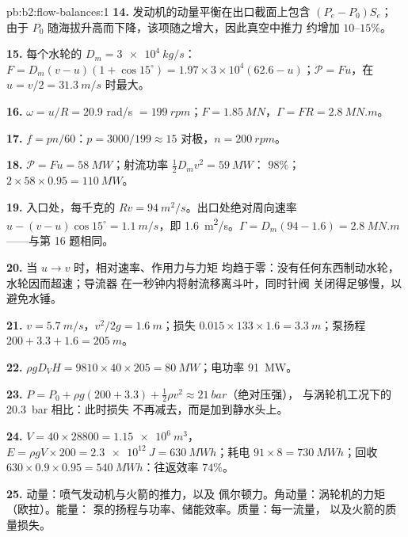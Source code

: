 \begin{solution}{pb:b2:flow-balances:1}
\textbf{14.} 发动机的动量平衡在出口截面上包含 $(P_e - P_0)S_e$；
由于 $P_0$ 随海拔升高而下降，该项随之增大，因此真空中推力
约增加 $10$--$15\%$。

\textbf{15.} 每个水轮的 $D_m = \qty{3e4}{kg/s}$：$F = D_m(v - u)(1 + \cos15^\circ) =
1.97 \times 3 \times 10^4(62.6 - u)$；$\mathcal P = Fu$，在 $u = v/2 = \qty{31.3}{m/s}$ 时最大。

\textbf{16.} $\omega = u/R = 20.9$ rad/s $= \qty{199}{rpm}$；$F = \qty{1.85}{MN}$，$\Gamma = FR
= \qty{2.8}{MN.m}$。

\textbf{17.} $f = pn/60$：$p = 3000/199 \approx 15$ 对极，$n = \qty{200}{rpm}$。

\textbf{18.} $\mathcal P = Fu = \qty{58}{MW}$；射流功率 $\tfrac12D_mv^2 = \qty{59}{MW}$：
$98\%$；$2 \times 58 \times 0.95 = \qty{110}{MW}$。

\textbf{19.} 入口处，每千克的 $Rv = \qty{94}{m^2/s}$。出口处绝对周向速率
$u - (v - u)\cos15^\circ = \qty{1.1}{m/s}$，即 \qty{1.6}{m^2/s}。$\Gamma = D_m(94 -
1.6) = \qty{2.8}{MN.m}$——与第 16 题相同。

\textbf{20.} 当 $u \to v$ 时，相对速率、作用力与力矩
均趋于零：没有任何东西制动水轮，水轮因而超速；导流器
在一秒钟内将射流移离斗叶，同时针阀
关闭得足够慢，以避免水锤。

\textbf{21.} $v = \qty{5.7}{m/s}$，$v^2/2g = \qty{1.6}{m}$；损失 $0.015 \times 133 \times 1.6 =
\qty{3.3}{m}$；泵扬程 $200 + 3.3 + 1.6 = \qty{205}{m}$。

\textbf{22.} $\rho gD_VH = 9810 \times 40 \times 205 = \qty{80}{MW}$；电功率 \qty{91}{MW}。

\textbf{23.} $P = P_0 + \rho g(200 + 3.3) + \tfrac12\rho v^2 \approx \qty{21}{bar}$（绝对压强），
与涡轮机工况下的 \qty{20.3}{bar} 相比：此时损失
不再减去，而是加到静水头上。

\textbf{24.} $V = 40 \times 28800 = \qty{1.15e6}{m^3}$，$E = \rho gV \times 200 = \qty{2.3e12}{J}
= \qty{630}{MWh}$；耗电 $91 \times 8 = \qty{730}{MWh}$；回收 $630 \times 0.9 \times
0.95 = \qty{540}{MWh}$：往返效率 $74\%$。

\textbf{25.} 动量：喷气发动机与火箭的推力，以及
佩尔顿力。角动量：涡轮机的力矩（欧拉）。能量：
泵的扬程与功率、储能效率。质量：每一流量，
以及火箭的质量损失。
\end{solution}
